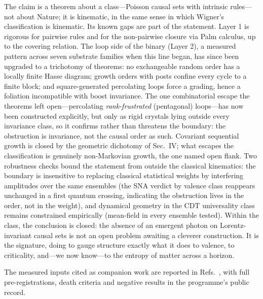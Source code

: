 \documentclass[aps,prd,reprint,nofootinbib,superscriptaddress,floatfix]{revtex4-2}
\begin{document}
The claim is a theorem about a class---Poisson causal sets with intrinsic rules---not
about Nature; it is kinematic, in the same sense in which Wigner's classification is
kinematic. Its known gaps are part of the statement. Layer 1 is rigorous for pairwise
rules and for the non-pairwise closure via Palm calculus, up to the covering relation.
The loop side of the binary (Layer 2), a measured pattern across seven substrate families
when this line began, has since been upgraded to a trichotomy of theorems: no exchangeable
random order has a locally finite Hasse diagram; growth orders with posts confine every
cycle to a finite block; and square-generated percolating loops force a grading, hence a
foliation incompatible with boost invariance. The one combinatorial escape the theorems
left open---percolating \emph{rank-frustrated} (pentagonal) loops---has now been
constructed explicitly, but only as rigid crystals lying outside every invariance class,
so it confirms rather than threatens the boundary: the obstruction is invariance, not the
causal order as such. Covariant sequential growth is closed by the geometric dichotomy
of Sec.~IV; what escapes the classification is genuinely non-Markovian growth, the one
named open flank. Two robustness checks bound the statement from outside the classical
kinematics: the boundary is insensitive to replacing classical statistical weights by
interfering amplitudes over the same ensembles (the SNA verdict by valence class
reappears unchanged in a first quantum crossing, indicating the obstruction lives in
the order, not in the weight), and dynamical geometry in the CDT universality class
remains constrained empirically (mean-field in every ensemble tested). Within the
class, the conclusion is closed: the absence of an emergent
photon on Lorentz-invariant causal sets is not an open problem awaiting a cleverer
construction. It is the signature, doing to gauge structure exactly what it does to
valence, to criticality, and---we now know---to the entropy of matter across a horizon.

\begin{acknowledgments}
The measured inputs cited as companion work are reported in
Refs.~\cite{MatterGravityPRD,SU3PRD}, with full pre-registrations, death criteria and
negative results in the programme's public record.
\end{acknowledgments}


\end{document}
